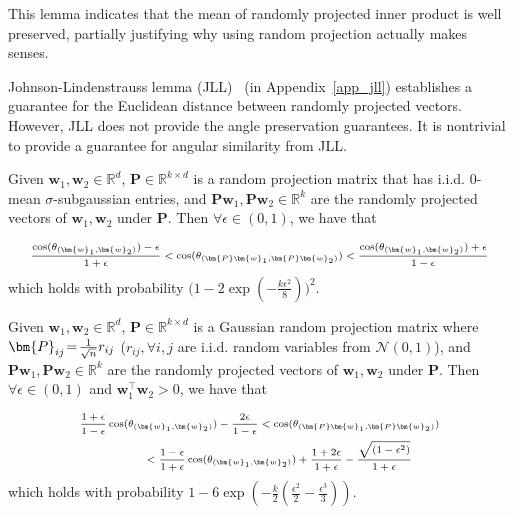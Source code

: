 \par This lemma indicates that the mean of randomly projected inner product is well preserved, partially justifying why using random projection actually makes senses.
\par
Johnson-Lindenstrauss lemma (JLL)~\cite{dasgupta2003elementary,kaban2015improved} (in Appendix~\ref{app_jll}) establishes a guarantee for the Euclidean distance between randomly projected vectors. However, JLL does not provide the angle preservation guarantees. It is nontrivial to provide a guarantee for angular similarity from JLL.
\par

\begin{theorem}\label{thm1}
Given $\bm{w}_1,\bm{w}_2\in\mathbb{R}^d$, $\bm{P}\in\mathbb{R}^{k\times d}$ is a random projection matrix that has i.i.d. $0$-mean $\sigma$-subgaussian entries, and $\bm{P}\bm{w}_1,\bm{P}\bm{w}_2\in\mathbb{R}^k$ are the randomly projected vectors of $\bm{w}_1,\bm{w}_2$ under $\bm{P}$. Then $\forall \epsilon\in(0,1)$, we have that

\begin{equation}
\scriptsize
\begin{aligned}
    \frac{\cos(\theta_{(\bm{w}_1,\bm{w}_2)})-\epsilon}{1+\epsilon}<\cos(\theta_{(\bm{P}\bm{w}_1,\bm{P}\bm{w}_2)})
    <\frac{\cos(\theta_{(\bm{w}_1,\bm{w}_2)})+\epsilon}{1-\epsilon}
\end{aligned}

\end{equation}
which holds with probability $\big(1-2\exp({-\frac{k\epsilon^2}{8}})\big)^2$. 
\end{theorem}

\par

\begin{theorem} Given $\bm{w}_1,\bm{w}_2\in\mathbb{R}^d$, $\bm{P}\in\mathbb{R}^{k\times d}$ is a Gaussian random projection matrix where $\thickmuskip=2mu \medmuskip=2mu \bm{P}_{ij}=\frac{1}{\sqrt{n}}r_{ij}$ ($r_{ij},\forall i,j$ are i.i.d. random variables from $\mathcal{N}(0,1)$), and $\bm{P}\bm{w}_1,\bm{P}\bm{w}_2\in\mathbb{R}^k$ are the randomly projected vectors of $\bm{w}_1,\bm{w}_2$ under $\bm{P}$. Then $\forall \epsilon\in(0,1)$ and $\bm{w}_1^\top\bm{w}_2>0$, we have that

\begin{equation}
\scriptsize
\begin{aligned}
    &\frac{1+\epsilon}{1-\epsilon}\cos(\theta_{(\bm{w}_1,\bm{w}_2)})-
    \frac{2\epsilon}{1-\epsilon}<\cos(\theta_{(\bm{P}\bm{w}_1,\bm{P}\bm{w}_2)})\\
    &\ \ \ \ \ \ \ \ \ \ \ \ \ \ \ \ \ <\frac{1-\epsilon}{1+\epsilon}\cos(\theta_{(\bm{w}_1,\bm{w}_2)})+\frac{1+2\epsilon}{1+\epsilon}-\frac{\sqrt{(1-\epsilon^2)}}{1+\epsilon}
\end{aligned}

\end{equation}
which holds with probability $1-6\exp(-\frac{k}{2}(\frac{\epsilon^2}{2}-\frac{\epsilon^3}{3}))$. 
\label{thm2}\end{theorem}


